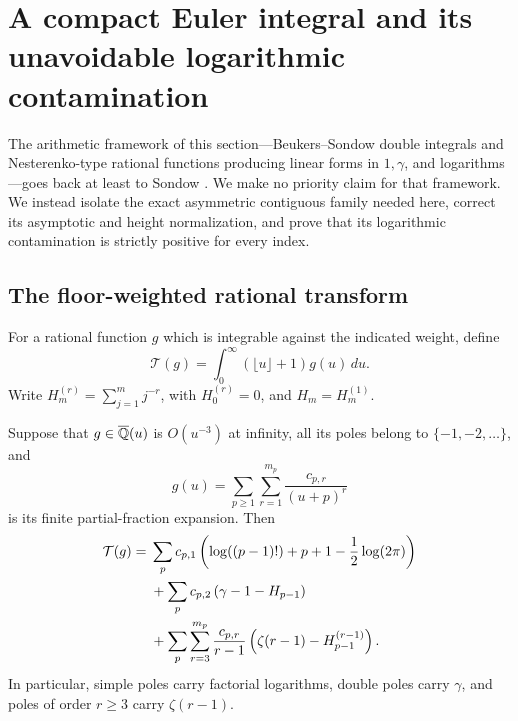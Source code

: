 \section{A compact Euler integral and its unavoidable logarithmic
contamination}
\label{sec:compact-integral-contamination}

The arithmetic framework of this section---Beukers--Sondow double
integrals and Nesterenko-type rational functions producing linear forms in
\(1,\gamma\), and logarithms---goes back at least to Sondow
\cite{Sondow2003Criteria,Sondow2009Hypergeometric}.  We make no priority
claim for that framework.  We instead isolate the exact asymmetric
contiguous family needed here, correct its asymptotic and height
normalization, and prove that its logarithmic contamination is strictly
positive for every index.

\subsection{The floor-weighted rational transform}

For a rational function \(g\) which is integrable against the indicated
weight, define
\begin{equation}\label{eq:floor-transform}
 \mathcal T(g)=\int_0^\infty(\lfloor u\rfloor+1)g(u)\,du.
\end{equation}
Write \(H_m^{(r)}=\sum_{j=1}^m j^{-r}\), with \(H_0^{(r)}=0\), and
\(H_m=H_m^{(1)}\).

\begin{proposition}
\label{prop:complete-pole-transducer}
Suppose that \(g\in\overline{\mathbb Q}(u)\) is \(O(u^{-3})\) at infinity, all its poles
belong to \(\{-1,-2,\ldots\}\), and
\[
 g(u)=\sum_{p\ge1}\sum_{r=1}^{m_p}
       \frac{c_{p,r}}{(u+p)^r}
\]
is its finite partial-fraction expansion.  Then
\begin{align}
 \mathcal T(g)
 ={}&\sum_p c_{p,1}
 \left(\log((p-1)!)+p+1-\frac12\log(2\pi)\right)
 \notag\\
 &+\sum_p c_{p,2}\left(\gamma-1-H_{p-1}\right)
 \label{eq:complete-pole-transducer}\\
 &+\sum_p\sum_{r=3}^{m_p}
 \frac{c_{p,r}}{r-1}
 \left(\zeta(r-1)-H_{p-1}^{(r-1)}\right).
 \notag
\end{align}
In particular, simple poles carry factorial logarithms, double poles carry
\(\gamma\), and poles of order \(r\ge3\) carry \(\zeta(r-1)\).
\end{proposition}

